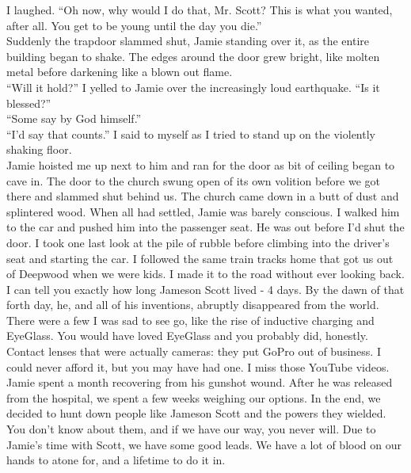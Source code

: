\documentclass[a5paper]{scrartcl}
\begin{document}
I laughed. \enquote{Oh now, why would I do that, Mr. Scott? This is what you wanted, after all. You get to be young until the day you die.} \\


Suddenly the trapdoor slammed shut, Jamie standing over it, as the entire building began to shake. The edges around the door grew bright, like molten metal before darkening like a blown out flame.\\


\enquote{Will it hold?} I yelled to Jamie over the increasingly loud earthquake. \enquote{Is it blessed?}\\


\enquote{Some say by God himself.}\\


\enquote{I'd say that counts.} I said to myself as I tried to stand up on the violently shaking floor.\\


Jamie hoisted me up next to him and ran for the door as bit of ceiling began to cave in. The door to the church swung open of its own volition before we got there and slammed shut behind us. The church came down in a butt of dust and splintered wood. When all had settled, Jamie was barely conscious. I walked him to the car and pushed him into the passenger seat. He was out before I'd shut the door. I took one last look at the pile of rubble before climbing into the driver's seat and starting the car. I followed the same train tracks home that got us out of Deepwood when we were kids. I made it to the road without ever looking back.\\


I can tell you exactly how long Jameson Scott lived - 4 days. By the dawn of that forth day, he, and all of his inventions, abruptly disappeared from the world. There were a few I was sad to see go, like the rise of inductive charging and EyeGlass. You would have loved EyeGlass and you probably did, honestly.  Contact lenses that were actually cameras: they put GoPro out of business. I could never afford it, but you may have had one. I miss those YouTube videos. \\


Jamie spent a month recovering from his gunshot wound. After he was released from the hospital, we spent a few weeks weighing our options. In the end, we decided to hunt down people like Jameson Scott and the powers they wielded. You don't know about them, and if we have our way, you never will. Due to Jamie's time with Scott, we have some good leads. We have a lot of blood on our hands to atone for, and a lifetime to do it in. \\
\end{document}

